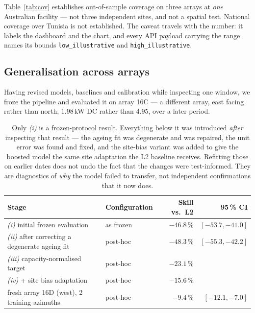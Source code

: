 \documentclass[11pt,a4paper]{article}
\newcommand{\unit}[1]{\,\textsf{\small #1}}
\newcommand{\keybox}[1]{%
  \par\vspace{0.35em}\noindent\colorbox{callout}{%
  \begin{minipage}{\dimexpr\linewidth-2\fboxsep}\small #1\end{minipage}}\vspace{0.35em}\par}
\begin{document}
\keybox{Table~\ref{tab:cov} establishes out-of-sample coverage on three arrays
at \emph{one} Australian facility --- not three independent sites, and not a
spatial test. National coverage over Tunisia is not established. The caveat
travels with the number: it labels the dashboard and the chart, and every API
payload carrying the range names its bounds \texttt{low\_illustrative} and
\texttt{high\_illustrative}.}

\subsection{Generalisation across arrays}
\label{sec:gen}

Having revised models, baselines and calibration while inspecting one window, we
froze the pipeline and evaluated it on array 16C --- a different array, east
facing rather than north, 1.98\unit{kW} DC rather than 4.95, over a later period.

\begin{table}[H]
\centering\small
\begin{tabular}{@{}llrr@{}}
\toprule
\textbf{Stage} & \textbf{Configuration} & \textbf{Skill vs.\ L2} & \textbf{95\,\% CI} \\
\midrule
\emph{(i)} initial frozen evaluation & as frozen & $-46.8\,\%$ & $[-53.7, -41.0]$ \\
\emph{(ii)} after correcting a degenerate ageing fit & post-hoc & $-48.3\,\%$ & $[-55.3, -42.2]$ \\
\emph{(iii)} capacity-normalised target & post-hoc & $-23.1\,\%$ & \\
\emph{(iv)} \quad + site bias adaptation & post-hoc & $-15.6\,\%$ & \\
\midrule
fresh array 16D (west), 2 training azimuths & post-hoc & $-9.4\,\%$ & $[-12.1, -7.0]$ \\
\bottomrule
\end{tabular}
\caption{Only \emph{(i)} is a frozen-protocol result. Everything below it was
introduced \emph{after} inspecting that result --- the ageing fit was degenerate
and was repaired, the unit error was found and fixed, and the site-bias variant
was added to give the boosted model the same site adaptation the L2 baseline
receives. Refitting those on earlier dates does not undo the fact that the
changes were test-informed. They are diagnostics of \emph{why} the model failed
to transfer, not independent confirmations that it now does.}
\end{table}
\end{document}
